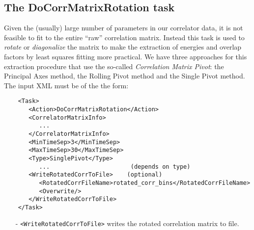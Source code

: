 \documentclass[12pt]{article}
\newcommand{\vb}{\texttt}
\begin{document}
\subsection{The DoCorrMatrixRotation task} \label{sec:rotation}
Given the (usually) large number of parameters in our correlator data, it is not feasible to fit to the entire ``raw'' correlation matrix. Instead this task is used to \textit{rotate} or \textit{diagonalize} the matrix to make the extraction of energies and overlap factors by least squares fitting more practical. We have three approaches for this extraction procedure that use the so-called \textit{Correlation Matrix Pivot}: the Principal Axes method, the Rolling Pivot method and the Single Pivot method.\\

The input XML must be of the the form:
\begin{verbatim}
    <Task>                                                                   
       <Action>DoCorrMatrixRotation</Action>                                 
       <CorrelatorMatrixInfo>                                                
          ...                                                                
       </CorrelatorMatrixInfo>                                               
       <MinTimeSep>3</MinTimeSep>                                            
       <MaxTimeSep>30</MaxTimeSep>                                           
       <Type>SinglePivot</Type>                                              
          ...                       (depends on type)
       <WriteRotatedCorrToFile>    (optional)                                     
          <RotatedCorrFileName>rotated_corr_bins</RotatedCorrFileName>            
          <Overwrite/>                                                            
       </WriteRotatedCorrToFile>                                                                                                
    </Task>                                                                  
\end{verbatim}
\begin{itemize}
\item[-] \vb{<WriteRotatedCorrToFile>} writes the rotated correlation matrix to file.
\end{itemize}
\end{document}
